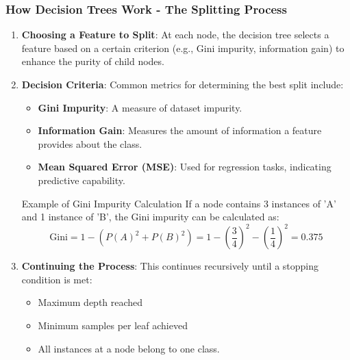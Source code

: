 \documentclass[aspectratio=169]{beamer}
\begin{document}
\begin{frame}[fragile]
    \frametitle{How Decision Trees Work - The Splitting Process}
    \begin{enumerate}
        \item \textbf{Choosing a Feature to Split}: At each node, the decision tree selects a feature based on a certain criterion (e.g., Gini impurity, information gain) to enhance the purity of child nodes.
        
        \item \textbf{Decision Criteria}: Common metrics for determining the best split include:
            \begin{itemize}
                \item \textbf{Gini Impurity}: A measure of dataset impurity.
                \item \textbf{Information Gain}: Measures the amount of information a feature provides about the class.
                \item \textbf{Mean Squared Error (MSE)}: Used for regression tasks, indicating predictive capability.
            \end{itemize}
            \begin{block}{Example of Gini Impurity Calculation}
                If a node contains 3 instances of 'A' and 1 instance of 'B', the Gini impurity can be calculated as:
                \begin{equation}
                    \text{Gini} = 1 - (P(A)^2 + P(B)^2) = 1 - \left(\frac{3}{4}\right)^2 - \left(\frac{1}{4}\right)^2 = 0.375
                \end{equation}
            \end{block}
        
        \item \textbf{Continuing the Process}: This continues recursively until a stopping condition is met: 
            \begin{itemize}
                \item Maximum depth reached
                \item Minimum samples per leaf achieved
                \item All instances at a node belong to one class.
            \end{itemize}
    \end{enumerate}
\end{frame}
\end{document}

